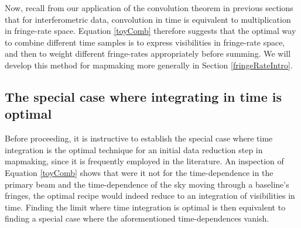 \documentclass[twocolumn,apj,numberedappendix]{emulateapj}
\begin{document}
Now, recall from our application of the convolution theorem in previous sections
that for interferometric data, convolution in time is equivalent to multiplication 
in fringe-rate space.  Equation \eqref{toyComb}
therefore suggests that the optimal way to combine different time samples is to
express visibilities in fringe-rate space, and then to weight different
fringe-rates appropriately before summing.  We will develop this method for mapmaking more generally in Section \ref{fringeRateIntro}.


\subsection{The special case where integrating in time is optimal}

Before proceeding, it is instructive to establish the special case where time
integration is the optimal technique for an initial data reduction step in mapmaking, since it is frequently employed in the
literature.  An inspection of Equation \eqref{toyComb} shows that were it not
for the time-dependence in the primary beam and the time-dependence of the sky
moving through a baseline's fringes, the optimal recipe would indeed reduce to
an integration of visibilities in time.  Finding the limit where time
integration is optimal is then equivalent to finding a special case where the
aforementioned time-dependences vanish.
\end{document}
